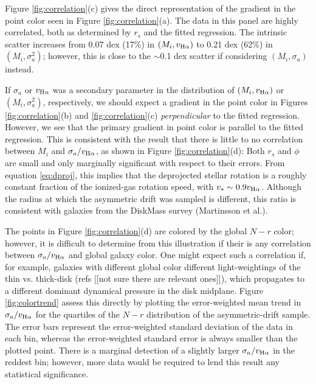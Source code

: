 \documentclass[apj,iop,revtex4,numberedappendix]{emulateapj}
\begin{document}
Figure \ref{fig:correlation}(c) gives the direct representation of the
gradient in the point color seen in Figure \ref{fig:correlation}(a).
The data in this panel are highly correlated, both as determined by
$r_s$ and the fitted regression.  The intrinsic scatter increases from
0.07 dex (17\%) in $(M_i,v_{{\rm H}\alpha})$ to 0.21 dex (62\%) in
$(M_i,\sigma_a^2)$; however, this is close to the $\sim$0.1 dex scatter
if considering $(M_i,\sigma_a)$ instead.

If $\sigma_a$ or $v_{{\rm H}\alpha}$ was a secondary parameter in the
distribution of $(M_i,v_{{\rm H}\alpha})$ or $(M_i,\sigma_a^2)$,
respectively, we should expect a gradient in the point color in Figures
\ref{fig:correlation}(b) and \ref{fig:correlation}(c) {\em
perpendicular} to the fitted regression.  However, we see that the
primary gradient in point color is parallel to the fitted regression.
This is consistent with the result that there is little to no
correlation between $M_i$ and $\sigma_a/v_{{\rm H}\alpha}$, as shown in
Figure \ref{fig:correlation}(d):  Both $r_s$ and $\phi$ are small and
only marginally significant with respect to their errors.  From equation
\ref{eq:dproj}, this implies that the deprojected stellar rotation is a
roughly constant fraction of the ionized-gas rotation speed, with
$v_{\ast} \sim 0.9 v_{{\rm H}\alpha}$.  Although the radius at which the
asymmetric drift was sampled is different, this ratio is consistent with
galaxies from the DiskMass survey (Martinsson et al.).

The points in Figure \ref{fig:correlation}(d) are colored by the global
$N-r$ color; however, it is difficult to determine from this
illustration if their is any correlation between $\sigma_a/v_{{\rm
H}\alpha}$ and global galaxy color.  One might expect such a correlation
if, for example, galaxies with different global color different
light-weightings of the thin vs. thick-disk (refs [[not sure there are
relevant ones]]), which propagates to a different dominant dynamical
pressure in the disk midplane.  Figure \ref{fig:colortrend} assess this
directly by plotting the error-weighted mean trend in $\sigma_a/v_{{\rm
H}\alpha}$ for the quartiles of the $N-r$ distribution of the
asymmetric-drift sample.  The error bars represent the error-weighted
standard deviation of the data in each bin, whereas the error-weighted
standard error is always smaller than the plotted point.  There is a
marginal detection of a slightly larger $\sigma_a/v_{{\rm H}\alpha}$ in
the reddest bin; however, more data would be required to lend this
result any statistical significance.
\end{document}
